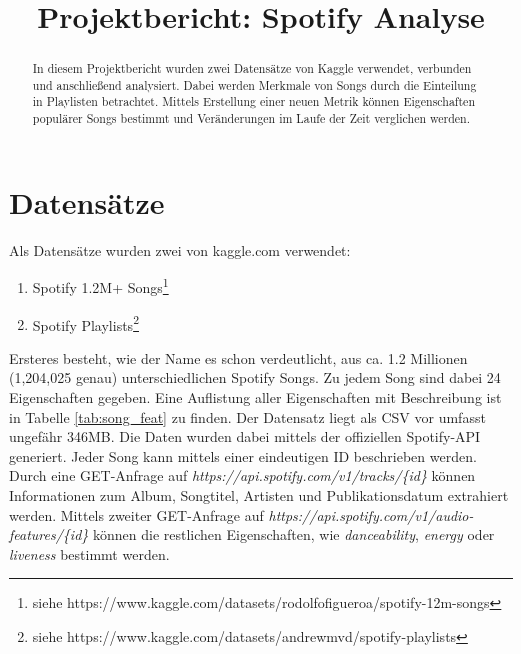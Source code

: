\documentclass[conference]{IEEEtran}
\begin{document}
\title{Projektbericht: Spotify Analyse\\}

\author{
\and
{}
}

\maketitle

\begin{abstract}
In diesem Projektbericht wurden zwei Datensätze von Kaggle verwendet, verbunden und anschließend analysiert. Dabei werden Merkmale von Songs durch die Einteilung in Playlisten betrachtet. Mittels Erstellung einer neuen Metrik können Eigenschaften populärer Songs bestimmt und Veränderungen im Laufe der Zeit verglichen werden.
\end{abstract}


\section{Datensätze}

Als Datensätze wurden zwei von kaggle.com verwendet:
\begin{enumerate}
    \item Spotify 1.2M+ Songs\footnote{siehe https://www.kaggle.com/datasets/rodolfofigueroa/spotify-12m-songs}
    \item Spotify Playlists\footnote{siehe https://www.kaggle.com/datasets/andrewmvd/spotify-playlists}
\end{enumerate}
Ersteres besteht, wie der Name es schon verdeutlicht, aus ca. 1.2 Millionen (1,204,025 genau) unterschiedlichen Spotify Songs. Zu jedem Song sind dabei 24 Eigenschaften gegeben. Eine Auflistung aller Eigenschaften mit Beschreibung ist in Tabelle \eqref{tab:song_feat} zu finden. Der Datensatz liegt als CSV vor umfasst ungefähr 346MB. Die Daten wurden dabei mittels der offiziellen Spotify-API generiert. Jeder Song kann mittels einer eindeutigen ID beschrieben werden. Durch eine GET-Anfrage auf \textit{https://api.spotify.com/v1/tracks/\{id\}} können Informationen zum Album, Songtitel, Artisten und Publikationsdatum extrahiert werden. Mittels zweiter GET-Anfrage auf \textit{https://api.spotify.com/v1/audio-features/\{id\}} können die restlichen Eigenschaften, wie \textit{danceability}, \textit{energy} oder \textit{liveness} bestimmt werden.
\end{document}
